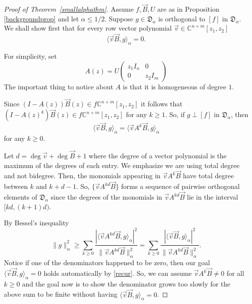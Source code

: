 \documentclass[11 pt,reqno]{amsart}
\theoremstyle{definition}
\theoremstyle{remark}
\numberwithin{equation}{section} \numberwithin{figure}{section}
\begin{document}
\begin{proof}[Proof of Theorem~\ref{smallalphathm}]
Assume $f,\vec{B}, U$ are as in
  Proposition \ref{backgroundprop} and let $\alpha \leq 1/2$.  Suppose
  $g \in {\mathfrak{D}_{\alpha}}$ is orthogonal to $[f]$ in ${\mathfrak{D}_{\alpha}}$.  We shall show first that for every row
  vector polynomial $\vec{v} \in {{\mathbb C}}^{n+m}[z_1,z_2]$
\[
{\langle {\vec{v} \vec{B} }, {g} \rangle}_{\alpha} = 0.
\]

For simplicity, set 
\[A(z) = U \begin{pmatrix} z_1 I_n & 0 \\ 0 & z_2
  I_m \end{pmatrix} \]
The important thing to notice about $A$ is that it is homogeneous of degree $1$.

Since $(I-A(z)) \vec{B}(z) \in f {{\mathbb C}}^{n+m}[z_1,z_2]$ it follows that
$(I-A(z)^k) \vec{B}(z) \in f {{\mathbb C}}^{n+m}[z_1,z_2]$ for any $k \geq 1$.
So, if $g \perp [f]$ in ${\mathfrak{D}_{\alpha}}$, then
\begin{equation} \label{recur}
{\langle {\vec{v} \vec{B}}, {g} \rangle}_{\alpha} = {\langle {\vec{v} A^k \vec{B}}, {g} \rangle}_{\alpha}
\end{equation}
for any $k\geq 0$.  

Let $d = \deg \vec{v} + \deg \vec{B} + 1$ where the degree of a vector
polynomial is the maximum of the degrees of each entry. We
emphasize we are using total degree and not bidegree.  Then, the
monomials appearing in $\vec{v} A^k \vec{B}$ have total degree between $k$
and $k+d-1$.  So, $\{\vec{v} A^{kd} \vec{B} \}$ forms a sequence of pairwise
orthogonal elements of ${\mathfrak{D}_{\alpha}}$ since the degrees of the monomials in $\vec{v}
A^{kd} \vec{B}$ lie in the interval $[kd, (k+1)d)$.

By Bessel's inequality
\[
\|g\|^2_{\alpha} \geq \sum_{k\geq 0} \frac{|{\langle {\vec{v} A^{kd}
    \vec{B}}, {g} \rangle}_{\alpha}|^2}{\|\vec{v} A^{kd} \vec{B}\|^2_{\alpha}} 
= \sum_{k\geq 0} \frac{|{\langle {\vec{v}\vec{B}}, {g} \rangle}_{\alpha}|^2}{\|\vec{v} A^{kd} \vec{B}\|^2_{\alpha}}. 
\]
Notice if one of the denominators happened to be zero, then our goal
${\langle {\vec{v} \vec{B}}, {g} \rangle}_{\alpha} = 0$ holds automatically by \eqref{recur}.
So, we can assume $\vec{v} A^k \vec{B} \ne 0$ for all $k \geq 0$ and the
goal now is to show the denominator grows too slowly for the above sum
to be finite without having ${\langle {\vec{v} \vec{B}}, {g} \rangle}_{\alpha} = 0$.


\end{proof}
\end{document}

